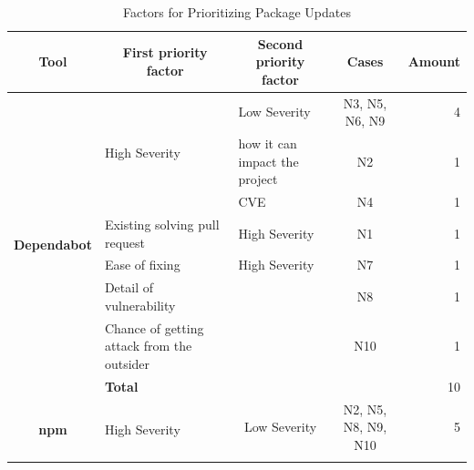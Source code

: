 \documentclass[conference]{IEEEtran}
\begin{document}
	\begin{table}[tb]
		\caption{Factors for Prioritizing Package Updates}
		\centering
		\begin{tabular}{|c|l|c|c|r|} \hline
			\textbf{Tool}                                     & \multicolumn{1}{c|}{\textbf{First priority factor}} & \textbf{Second priority factor}                    & \textbf{Cases}      & \textbf{Amount} \\ \hline
			\multicolumn{1}{|c|}{\multirow{8}{*}{\textbf{Dependabot}}} & \multirow{3}{*}{High Severity}                      & \multicolumn{1}{l|}{Low Severity}                  & N3, N5, N6, N9      & 4               \\ \cline{3-5} 
			\multicolumn{1}{|c|}{}                                     &                                                     & \multicolumn{1}{l|}{how it can impact the project} & N2                  & 1               \\ \cline{3-5} 
			\multicolumn{1}{|c|}{}                                     &                                                     & \multicolumn{1}{l|}{CVE}                           & N4                  & 1               \\ \cline{2-5} 
			\multicolumn{1}{|c|}{}                                     & Existing solving pull request                       & \multicolumn{1}{l|}{High Severity}                 & N1                  & 1               \\ \cline{2-5} 
			\multicolumn{1}{|c|}{}                                     & Ease of fixing                                      & \multicolumn{1}{l|}{High Severity}                 & N7                  & 1               \\ \cline{2-5} 
			\multicolumn{1}{|c|}{}                                     & Detail of vulnerability                             & \multicolumn{1}{l|}{}                              & N8                  & 1               \\ \cline{2-5} 
			\multicolumn{1}{|c|}{}                                     & Chance of getting attack from the outsider          & \textbf{}                                          & N10                 & 1               \\ \cline{2-5} 
			\multicolumn{1}{|l|}{}                                     & \multicolumn{3}{l|}{\textbf{Total}}                                                                                            & 10              \\ \hline
			\multicolumn{1}{|c|}{\multirow{6}{*}{\textbf{npm}}}        & \multicolumn{1}{l|}{\multirow{3}{*}{High Severity}} & Low Severity                                       & N2, N5, N8, N9, N10 & 5               \\ \cline{3-5} 

\end{tabular}
\end{table}
\end{document}
